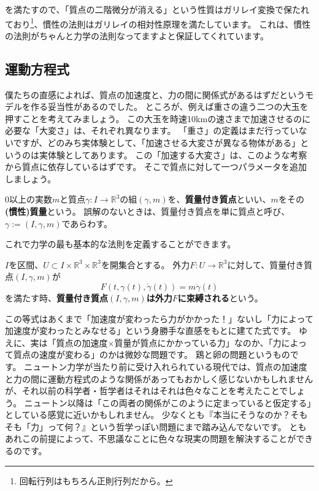 を満たすので、「質点の二階微分が消える」という性質はガリレイ変換で保たれており\footnote{
  回転行列はもちろん正則行列だから。
}、慣性の法則はガリレイの相対性原理を満たしています。
これは、慣性の法則がちゃんと力学の法則なってますよと保証してくれています。

\subsection{運動方程式}

僕たちの直感によれば、質点の加速度と、力の間に関係式があるはずだというモデルを作る妥当性があるのでした。
ところが、例えば重さの違う二つの大玉を押すことを考えてみましょう。
この大玉を時速10kmの速さまで加速させるのに必要な「大変さ」は、それぞれ異なります。
「重さ」の定義はまだ行っていないですが、どのみち実体験として、「加速させる大変さが異なる物体がある」というのは実体験としてあります。
この「加速する大変さ」は、このような考察から質点に依存しているはずです。
そこで質点に対して一つパラメータを追加しましょう。

\begin{definition}[慣性質量]
  0以上の実数$m$と質点$\gamma:I\to\mathbb{R}^3$の組$(\gamma,m)$を、\textbf{質量付き質点}といい、$m$をその\textbf{(慣性)質量}という。
  誤解のないときは、質量付き質点を単に質点と呼び、$\gamma:=(I,\gamma,m)$であらわす。
\end{definition}

これで力学の最も基本的な法則を定義することができます。
\begin{definition}[運動方程式]
  $I$を区間、$U\subset I\times\mathbb{R}^3\times\mathbb{R}^3$を開集合とする。
  外力$F:U\to\mathbb{R}^3$に対して、質量付き質点$(I,\gamma,m)$が
  \[
    F(t,\gamma(t),\dot\gamma(t))=m\ddot\gamma(t)
  \]
  を満たす時、\textbf{質量付き質点$(I,\gamma,m)$は外力$F$に束縛される}という。
\end{definition}

この等式はあくまで「加速度が変わったら力がかかった！」ないし「力によって加速度が変わったとみなせる」という身勝手な直感をもとに建てた式です。
ゆえに、実は「質点の加速度×質量が質点にかかっている力」なのか、「力によって質点の速度が変わる」のかは微妙な問題です。
鶏と卵の問題というものです。
ニュートン力学が当たり前に受け入れられている現代では、質点の加速度と力の間に運動方程式のような関係があってもおかしく感じないかもしれませんが、それ以前の科学者・哲学者はそれはそれは色々なことを考えたことでしょう。
ニュートン以降は「この両者の関係がこのように定まっていると仮定する」としている感覚に近いかもしれません。
少なくとも『本当にそうなのか？そもそも「力」って何？』という哲学っぽい問題にまで踏み込んでないです。
ともあれこの前提によって、不思議なことに色々な現実の問題を解決することができるのです。

